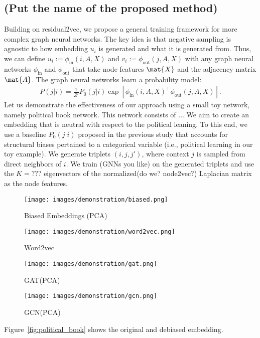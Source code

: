 \documentclass[sigconf,authordraft]{acmart}
\begin{document}
\subsection{(Put the name of the proposed method)}

Building on residual2vec, we propose a general training framework for more complex graph neural networks. The key idea is that negative sampling is agnostic to how embedding $u_i$ is generated and what it is generated from. Thus, we can define $u_i:=\phi_{\text{in}}(i, A, X)$ and $v_i:=\phi_{\text{out}}(j, A, X)$ with any graph neural networks $\phi_{\text{in}}$ and $\phi_{\text{out}}$ that take node features $\mat{X}$ and the adjacency matrix $\mat{A}$. The graph neural networks learn a probability model:
\begin{align}
P(j \vert i) = \frac{1}{Z'}P_0(j\vert i)\exp\left[\phi_{\text{in}}(i, A, X) ^\top \phi_{\text{out}}(j, A, X)\right]. \label{eq:proposed}
\end{align}
Let us demonstrate the effectiveness of our approach using a small toy network, namely political book network.
This network consists of ... 
We aim to create an embedding that is neutral with respect to the political leaning. To this end, we use a baseline $P_0(j\vert i)$ proposed in the previous study \cite{kojaku_residual2vec_2021} that accounts for structural biases pertained to a categorical variable (i.e., political learning in our toy example).
We generate triplets $(i,j,j')$, where context $j$ is sampled from direct neighbors of $i$.
We train (GNNs you like) on the generated triplets and use the $K=???$ eigenvectors of the normalized(do we? node2vec?) Laplacian matrix as the node features.

\begin{figure}[h]
  \centering
  \texttt{[image: images/demonstration/biased.png]}
  \caption{Biased Embeddings (PCA)}
\end{figure}

\begin{figure}[h]
  \centering
  \texttt{[image: images/demonstration/word2vec.png]}
  \caption{Word2vec }
\end{figure}

\begin{figure}[h]
  \centering
  \texttt{[image: images/demonstration/gat.png]}
  \caption{GAT(PCA)}
\end{figure}

\begin{figure}[h]
  \centering
  \texttt{[image: images/demonstration/gcn.png]}
  \caption{GCN(PCA)}
\end{figure}
Figure~\ref{fig:political_book} shows the original and debiased embedding. 
\end{document}
